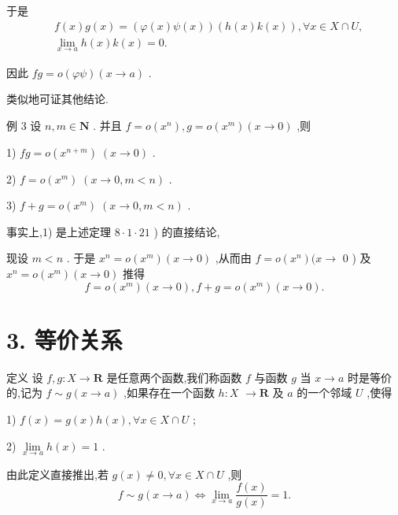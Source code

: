 于是
\begin{align*}
	&f\left( x\right) g\left( x\right)  = \left( {\varphi \left( x\right) \psi \left( x\right) }\right) \left( {h\left( x\right) k\left( x\right) }\right) ,\forall x \in  X \cap  U,\\
	&\mathop{\lim }\limits_{{x \rightarrow  a}}h\left( x\right) k\left( x\right)  = 0.
\end{align*}

因此 ${fg} = o\left( {\varphi \psi }\right) \left( {x \rightarrow  a}\right)$ .

类似地可证其他结论.

例 3 设 $n,m \in  \mathbf{N}$ . 并且 $f = o\left( {x}^{n}\right) ,g = o\left( {x}^{m}\right) \left( {x \rightarrow  0}\right)$ ,则

1) ${fg} = o\left( {x}^{n + m}\right) \;\left( {x \rightarrow  0}\right)$ .

2) $f = o\left( {x}^{m}\right) \;\left( {x \rightarrow  0,m < n}\right)$ .

3) $f + g = o\left( {x}^{m}\right) \;\left( {x \rightarrow  0,m < n}\right)$ .

事实上,1) 是上述定理 $8 \cdot  1 \cdot  {21}$ ) 的直接结论,

现设 $m < n$ . 于是 ${x}^{n} = o\left( {x}^{m}\right) \left( {x \rightarrow  0}\right)$ ,从而由 $f = o\left( {x}^{n}\right) (x \rightarrow$ 0 ) 及 ${x}^{n} = o\left( {x}^{m}\right) \left( {x \rightarrow  0}\right)$ 推得
$$f = o\left( {x}^{m}\right) \left( {x \rightarrow  0}\right) ,f + g = o\left( {x}^{m}\right) \left( {x \rightarrow  0}\right) .$$

\section*{3. 等价关系}

定义 设 $f,g : X \rightarrow  \mathbf{R}$ 是任意两个函数,我们称函数 $f$ 与函数 $g$ 当 $x \rightarrow  a$ 时是等价的,记为 $f \sim  g\left( {x \rightarrow  a}\right)$ ,如果存在一个函数 $h : X$  $\rightarrow  \mathbf{R}$ 及 $a$ 的一个邻域 $U$ ,使得

1) $f\left( x\right)  = g\left( x\right) h\left( x\right) ,\forall x \in  X \cap  U$ ;

2) $\mathop{\lim }\limits_{{x \rightarrow  a}}h\left( x\right)  = 1$ .

由此定义直接推出,若 $g\left( x\right)  \neq  0,\forall x \in  X \cap  U$ ,则
$$f \sim  g\left( {x \rightarrow  a}\right)  \Leftrightarrow  \mathop{\lim }\limits_{{x \rightarrow  a}}\frac{f\left( x\right) }{g\left( x\right) } = 1.$$

